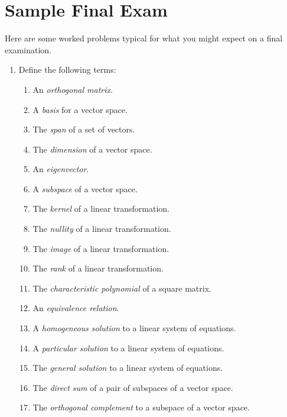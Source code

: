 \chapter{Sample Final Exam}

\label{sample3}

Here are some worked problems typical for what you might expect on a final examination.

\begin{enumerate}

\item Define the following terms:
\begin{enumerate}
\item An {\it orthogonal matrix}.
\item A {\it basis} for a vector space.
\item The {\it span} of a set of vectors.
\item The {\it dimension} of a vector space.
\item An {\it eigenvector}.
\item A {\it subspace} of a vector space.
\item The {\it kernel} of a linear transformation.
\item The {\it nullity} of a linear transformation.
\item The {\it image} of a linear transformation.
\item The {\it rank} of a linear transformation.
\item The {\it characteristic polynomial} of a square matrix.
\item An {\it equivalence relation}.
\item A {\it homogeneous solution} to a linear system of equations.
\item A {\it particular solution} to a linear system of equations.
\item The {\it general solution} to a linear system of equations.
\item The {\it direct sum} of a pair of subspaces of a vector space.
\item The {\it orthogonal complement} to a subspace of a vector space.
\end{enumerate}





\end{enumerate}
